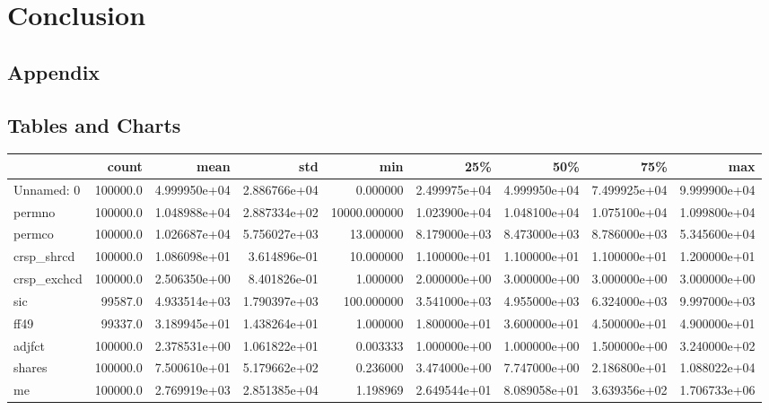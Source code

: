 \documentclass[10pt]{article}
\begin{document}
\section{Conclusion}
\newpage
\begin{landscape}
\section{Appendix}
\subsection{Tables and Charts}
\begin{longtable}{lrrrrrrrr}
\toprule
{} &     count &          mean &           std &           min &           25\% &           50\% &           75\% &           max \\
\midrule
Unnamed: 0              &  100000.0 &  4.999950e+04 &  2.886766e+04 &      0.000000 &  2.499975e+04 &  4.999950e+04 &  7.499925e+04 &  9.999900e+04 \\
permno                  &  100000.0 &  1.048988e+04 &  2.887334e+02 &  10000.000000 &  1.023900e+04 &  1.048100e+04 &  1.075100e+04 &  1.099800e+04 \\
permco                  &  100000.0 &  1.026687e+04 &  5.756027e+03 &     13.000000 &  8.179000e+03 &  8.473000e+03 &  8.786000e+03 &  5.345600e+04 \\
crsp\_shrcd              &  100000.0 &  1.086098e+01 &  3.614896e-01 &     10.000000 &  1.100000e+01 &  1.100000e+01 &  1.100000e+01 &  1.200000e+01 \\
crsp\_exchcd             &  100000.0 &  2.506350e+00 &  8.401826e-01 &      1.000000 &  2.000000e+00 &  3.000000e+00 &  3.000000e+00 &  3.000000e+00 \\
sic                     &   99587.0 &  4.933514e+03 &  1.790397e+03 &    100.000000 &  3.541000e+03 &  4.955000e+03 &  6.324000e+03 &  9.997000e+03 \\
ff49                    &   99337.0 &  3.189945e+01 &  1.438264e+01 &      1.000000 &  1.800000e+01 &  3.600000e+01 &  4.500000e+01 &  4.900000e+01 \\
adjfct                  &  100000.0 &  2.378531e+00 &  1.061822e+01 &      0.003333 &  1.000000e+00 &  1.000000e+00 &  1.500000e+00 &  3.240000e+02 \\
shares                  &  100000.0 &  7.500610e+01 &  5.179662e+02 &      0.236000 &  3.474000e+00 &  7.747000e+00 &  2.186800e+01 &  1.088022e+04 \\
me                      &  100000.0 &  2.769919e+03 &  2.851385e+04 &      1.198969 &  2.649544e+01 &  8.089058e+01 &  3.639356e+02 &  1.706733e+06 \\

\end{longtable}
\end{landscape}
\end{document}
